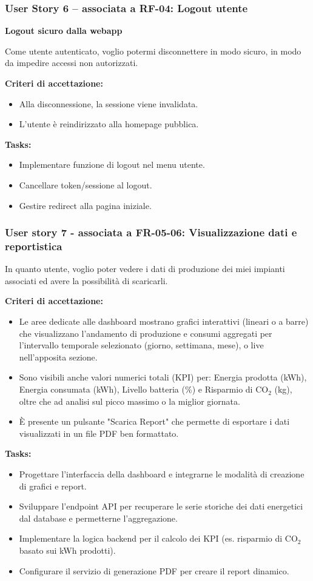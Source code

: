 \subsubsection*{User Story 6 – associata a RF-04: Logout utente}
\textbf{Logout sicuro dalla webapp}

Come utente autenticato, voglio potermi disconnettere in modo sicuro, in modo da impedire accessi non autorizzati.

\textbf{Criteri di accettazione:}
\begin{itemize}
    \item Alla disconnessione, la sessione viene invalidata.
    \item L’utente è reindirizzato alla homepage pubblica.
\end{itemize}
\textbf{Tasks:}
\begin{itemize}
    \item Implementare funzione di logout nel menu utente.
    \item Cancellare token/sessione al logout.
    \item Gestire redirect alla pagina iniziale.
\end{itemize}
\subsubsection*{User story 7 - associata a FR-05-06: Visualizzazione dati e reportistica}
In quanto utente, voglio poter vedere i dati di produzione dei miei impianti associati ed avere la possibilità di scaricarli.

\textbf{Criteri di accettazione:}
\begin{itemize}
    \item Le aree dedicate alle dashboard mostrano grafici interattivi (lineari o a barre) che visualizzano l'andamento di produzione e consumi aggregati per l'intervallo temporale selezionato (giorno, settimana, mese), o live nell'apposita sezione.
    \item Sono visibili anche valori numerici totali (KPI) per: Energia prodotta (kWh), Energia consumata (kWh), Livello batteria (\%) e Risparmio di CO$_2$ (kg), oltre che ad analisi sul picco massimo o la miglior giornata.
    \item È presente un pulsante "Scarica Report" che permette di esportare i dati visualizzati in un file PDF ben formattato.
\end{itemize}
\textbf{Tasks:}
\begin{itemize}
    \item Progettare l'interfaccia della dashboard e integrarne le modalità di creazione di grafici e report.
    \item Sviluppare l'endpoint API per recuperare le serie storiche dei dati energetici dal database e permetterne l'aggregazione.
    \item Implementare la logica backend per il calcolo dei KPI (es. risparmio di CO$_2$ basato sui kWh prodotti).
    \item Configurare il servizio di generazione PDF per creare il report dinamico.
\end{itemize}
